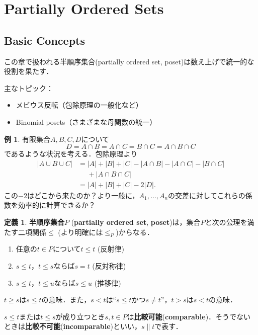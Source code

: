 \documentclass[xelatex,ja=standard,a4paper,14pt,everyparhook=compat]{bxjsarticle}
\theoremstyle{definition}
\newtheorem*{example*}{例}
\newtheorem*{definition*}{定義}
\begin{document}
\setcounter{section}{2}
\section{Partially Ordered Sets}
\subsection{Basic Concepts}

この章で扱われる半順序集合(partially ordered set, poset)は数え上げで統一的な役割を果たす．

主なトピック：\begin{itemize}
    \item メビウス反転（包除原理の一般化など）
    \item Binomial posets（さまざまな母関数の統一）
\end{itemize}

\begin{example*}
    有限集合$A,B,C,D$について \begin{equation*}
        D = A \cap B = A \cap C = B \cap C = A \cap B \cap C
    \end{equation*}
    であるような状況を考える．包除原理より \begin{align*}
        |A \cup B \cup C|
         & = |A| + |B| + |C| - |A \cap B| - |A \cap C| - |B \cap C| \\
         & \phantom{={}} + |A \cap B \cap C|                        \\
         & = |A| + |B| + |C| - 2|D|.
    \end{align*}
    この$-2$はどこから来たのか？より一般に，$A_1,\ldots,A_n$の交差に対してこれらの係数を効率的に計算できるか？
\end{example*}

\begin{definition*}
    \textbf{半順序集合}$P$ (\textbf{partially ordered set}, \textbf{poset})は，集合$P$と次の公理を満たす二項関係$\leq$ (より明確には$\leq_P$)からなる． \begin{enumerate}
        \item 任意の$t \in P$について$t \leq t$ (反射律)
        \item $s \leq t$，$t \leq s$ならば$s = t$ (反対称律)
        \item $s \leq t$，$t \leq u$ならば$s \leq u$ (推移律)
    \end{enumerate}
    $t \geq s$は$s \leq t$の意味．また，$s < t$は``$s \leq t$かつ$s \neq t$''，$t > s$は$s < t$の意味．

    $s \leq t$または$t \leq s$が成り立つとき$s,t \in P$は\textbf{比較可能}(\textbf{comparable})．そうでないときは\textbf{比較不可能}(\textbf{incomparable})といい，$s \parallel t$で表す．
\end{definition*}
\end{document}
